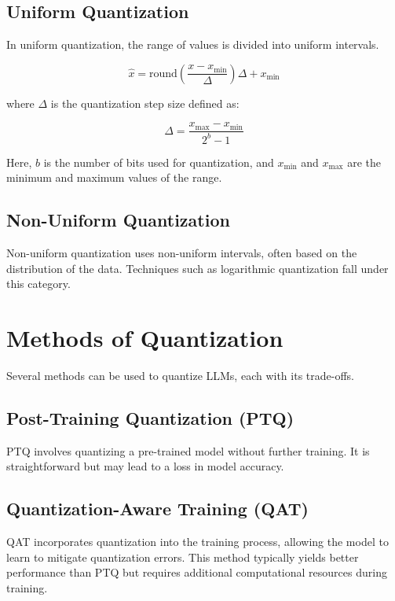 \subsection{Uniform Quantization}
In uniform quantization, the range of values is divided into uniform intervals.

\begin{equation}
\hat{x} = \text{round}\left(\frac{x - x_\text{min}}{\Delta}\right) \Delta + x_\text{min}
\end{equation}

where \( \Delta \) is the quantization step size defined as:

\begin{equation}
\Delta = \frac{x_\text{max} - x_\text{min}}{2^b - 1}
\end{equation}

Here, \( b \) is the number of bits used for quantization, and \( x_\text{min} \) and \( x_\text{max} \) are the minimum and maximum values of the range.

\subsection{Non-Uniform Quantization}
Non-uniform quantization uses non-uniform intervals, often based on the distribution of the data. Techniques such as logarithmic quantization fall under this category.

\section{Methods of Quantization}
Several methods can be used to quantize LLMs, each with its trade-offs.

\subsection{Post-Training Quantization (PTQ)}
PTQ involves quantizing a pre-trained model without further training. It is straightforward but may lead to a loss in model accuracy.

\subsection{Quantization-Aware Training (QAT)}
QAT incorporates quantization into the training process, allowing the model to learn to mitigate quantization errors. This method typically yields better performance than PTQ but requires additional computational resources during training.

